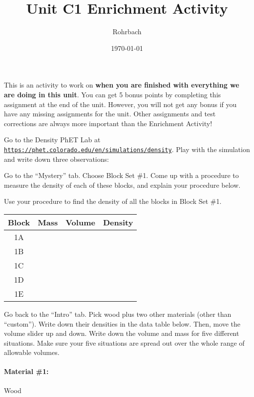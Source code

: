 \documentclass[10pt]{exam}
\title{Unit C1 Enrichment Activity}
\author{Rohrbach}
\date{\today}
\begin{document}
\maketitle

\noindent
This is an activity to work on {\bf when you are finished with everything we are doing in this unit}.  You can get 5 bonus points by completing this assignment at the end of the unit. However, you will not get any bonus if you have any missing assignments for the unit.  Other assignments and test corrections are always more important than the Enrichment Activity!

\begin{questions}
  \question
    Go to the Density PhET Lab at \texttt{\href{https://phet.colorado.edu/en/simulations/density}{https://phet.colorado.edu/en/simulations/density}}.  Play with the simulation and write down three observations:
    \vs 

  \question
    Go to the ``Mystery'' tab.  Choose Block Set \#1.  Come up with a procedure to measure the density of each of these blocks, and explain your procedure below.
    \vs 

  \question
    Use your procedure to find the density of all the blocks in Block Set \#1.

    \begin{tabular}{|c|p{5em}|p{5em}||p{5em}|}
      \hline
      Block & Mass & Volume & Density \\\hline
      1A    &&&\\[1em]\hline
      1B    &&&\\[1em]\hline
      1C    &&&\\[1em]\hline
      1D    &&&\\[1em]\hline
      1E    &&&\\[1em]\hline
    \end{tabular}


  \pagebreak
  \question
    Go back to the ``Intro'' tab.  Pick wood plus two other materials (other than ``custom'').  Write down their densities in the data table below.  Then, move the volume slider up and down.  Write down the volume and mass for five different situations.  Make sure your five situations are spread out over the whole range of allowable volumes.


    \begin{multicols}{3}

      \paragraph{Material \#1:} Wood
    

\end{multicols}
\end{questions}
\end{document}
